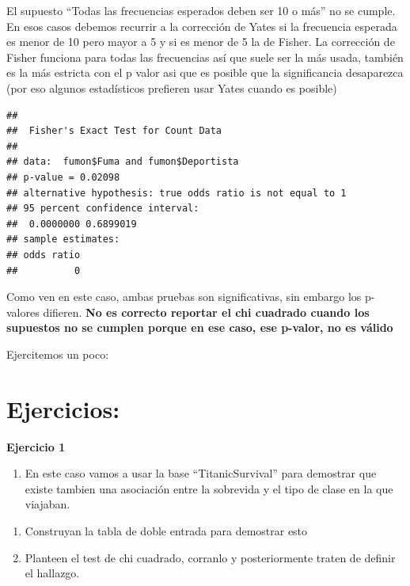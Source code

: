 \documentclass[
]{book}
\newenvironment{Shaded}{\begin{snugshade}}{\end{snugshade}}
\newcommand{\FunctionTok}[1]{\textcolor[rgb]{0.00,0.00,0.00}{#1}}
\newcommand{\NormalTok}[1]{#1}
\newcommand{\SpecialCharTok}[1]{\textcolor[rgb]{0.00,0.00,0.00}{#1}}
\providecommand{\tightlist}{%
  \setlength{\itemsep}{0pt}\setlength{\parskip}{0pt}}
\begin{document}
El supuesto ``Todas las frecuencias esperados deben ser 10 o más'' no se cumple. En esos casos debemos recurrir a la corrección de Yates si la frecuencia esperada es menor de 10 pero mayor a 5 y si es menor de 5 la de Fisher.
La corrección de Fisher funciona para todas las frecuencias así que suele ser la más usada, también es la más estricta con el p valor asi que es posible que la significancia desaparezca (por eso algunos estadísticos prefieren usar Yates cuando es posible)

\begin{Shaded}
\end{Shaded}

\begin{verbatim}
## 
##  Fisher's Exact Test for Count Data
## 
## data:  fumon$Fuma and fumon$Deportista
## p-value = 0.02098
## alternative hypothesis: true odds ratio is not equal to 1
## 95 percent confidence interval:
##  0.0000000 0.6899019
## sample estimates:
## odds ratio 
##          0
\end{verbatim}

Como ven en este caso, ambas pruebas son significativas, sin embargo los p-valores difieren. \textbf{No es correcto reportar el chi cuadrado cuando los supuestos no se cumplen porque en ese caso, ese p-valor, no es válido}

Ejercitemos un poco:

\hypertarget{ejercicios-5}{%
\section{\texorpdfstring{ Ejercicios:}{ Ejercicios:}}\label{ejercicios-5}}

\textbf{Ejercicio 1}

\begin{enumerate}
\def\labelenumi{\arabic{enumi}.}
\tightlist
\item
  En este caso vamos a usar la base ``TitanicSurvival'' para demostrar que existe tambien una asociación entre la sobrevida y el tipo de clase en la que viajaban.
\end{enumerate}

\begin{enumerate}
\def\labelenumi{\alph{enumi}.}
\item
  Construyan la tabla de doble entrada para demostrar esto
\item
  Planteen el test de chi cuadrado, corranlo y posteriormente traten de definir el hallazgo.
\end{enumerate}
\end{document}
